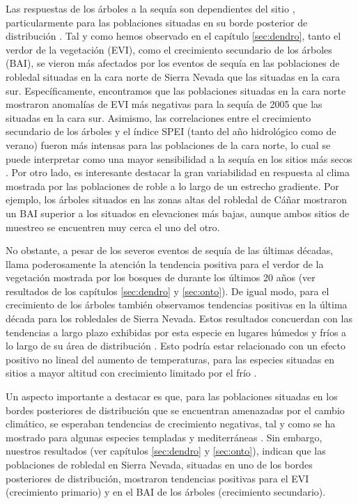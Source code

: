 Las respuestas de los árboles a la sequía son dependientes del sitio \autocite{Babstetal2013SiteSpecies}, particularmente para las poblaciones situadas en su borde posterior de distribución \autocites{CavinJump2017HighestDrought,DoradoLinanetal2017LargescaleAtmospheric}. 
Tal y como hemos observado en el capítulo \ref{sec:dendro}, tanto el verdor de la vegetación (EVI), como el crecimiento secundario de los árboles (BAI), se vieron más afectados por los eventos de sequía en las poblaciones de robledal situadas en la cara norte de Sierra Nevada que las situadas en la cara sur. Específicamente, encontramos que las poblaciones situadas en la cara norte mostraron anomalías de EVI más negativas para la sequía de 2005 que las situadas en la cara sur. Asimismo, las correlaciones entre el crecimiento secundario de los árboles y el índice SPEI (tanto del año hidrológico como de verano) fueron más intensas para las poblaciones de la cara norte, lo cual se puede interpretar como una mayor sensibilidad a la sequía en los sitios más secos \autocite{GeaIzquierdoCanellas2014LocalClimate}. Por otro lado, es interesante destacar la gran variabilidad en respuesta al clima mostrada por las poblaciones de roble a lo largo de un estrecho gradiente. Por ejemplo, los árboles situados en las zonas altas del robledal de Cáñar mostraron un BAI superior a los situados en elevaciones más bajas, aunque ambos sitios de muestreo se encuentren muy cerca el uno del otro. 

No obstante, a pesar de los severos eventos de sequía de las últimas décadas, llama poderosamente la atención la tendencia positiva para el verdor de la vegetación mostrada por los bosques de \Qp durante los últimos 20 años (ver resultados de los capítulos \ref{sec:dendro} y \ref{sec:onto}). De igual modo, para el crecimiento de los árboles también observamos tendencias positivas en la última década para los robledales de Sierra Nevada. Estos resultados concuerdan con las tendencias a largo plazo exhibidas por esta especie en lugares húmedos y fríos a lo largo de su área de distribución \autocite{GeaIzquierdoCanellas2014LocalClimate}. Esto podría estar relacionado con un efecto positivo no lineal del aumento de temperaturas, para las especies situadas en sitios a mayor altitud con crecimiento limitado por el frío \autocites{Salzeretal2009RecentUnprecedented,GeaIzquierdoCanellas2014LocalClimate}. 

Un aspecto importante a destacar es que, para las poblaciones situadas en los bordes posteriores de distribución que se encuentran amenazadas por el cambio climático, se esperaban tendencias de crecimiento negativas, tal y como se ha mostrado para algunas especies templadas y mediterráneas \autocites{SanchezSalgueroetal2012DroughtMain,Camareroetal2015NotEarly,DoradoLinanetal2017CoexistenceMediterraneanTemperate}. Sin embargo, nuestros resultados (ver capítulos \ref{sec:dendro} y \ref{sec:onto}), indican que las poblaciones de robledal en Sierra Nevada, situadas en uno de los bordes posteriores de distribución, mostraron tendencias positivas para el EVI (crecimiento primario) y en el BAI de los árboles (crecimiento secundario). 

